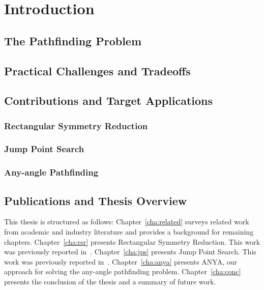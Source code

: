 \chapter{Introduction}
\label{cha:intro}

\section{The Pathfinding Problem}
\section{Practical Challenges and Tradeoffs}
\section{Contributions and Target Applications}
\subsection{Rectangular Symmetry Reduction}
\subsection{Jump Point Search}
\subsection{Any-angle Pathfinding}

\section{Publications and Thesis Overview}
\label{sec:outline}
This thesis is structured as follows: Chapter~\ref{cha:related}
surveys related work from academic and industry literature and provides 
a background for remaining chapters.
Chapter~\ref{cha:rsr}
presents Rectangular Symmetry Reduction. This work was
previously reported in~\cite{harabor10,harabor11a}.
Chapter~\ref{cha:jps} presents Jump Point Search. This work was
previously reported in~\cite{harabor11b,harabor12}.
Chapter~\ref{cha:anya} presents ANYA, our approach for solving
the any-angle pathfinding problem.
Chapter~\ref{cha:conc} presents the conclusion of the thesis
and a summary of future work.

